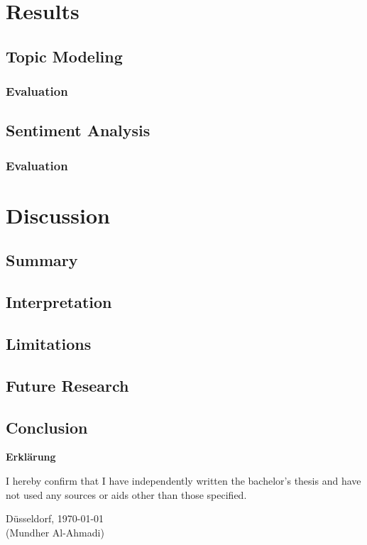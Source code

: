 \documentclass[12pt,english,titlepage,a4paper]{article}
\begin{document}
\section{Results}
\subsection{Topic Modeling}
\subsubsection{Evaluation}
\subsection{Sentiment Analysis}
\subsubsection{Evaluation}


\section{Discussion}
\subsection{Summary}
\subsection{Interpretation}
\subsection{Limitations}
\subsection{Future Research}
\subsection{Conclusion}


\pagebreak





\pagebreak\noindent
\textbf{\LARGE Erkl\"arung}

\bigskip\bigskip
\noindent 
I hereby confirm that I have independently written the 
bachelor's thesis and have not used any sources or aids 
other than those specified.
\bigskip
\noindent

\bigskip\bigskip\bigskip
\noindent
D\"usseldorf, \today \\
(Mundher Al-Ahmadi)

% 
\end{document}

